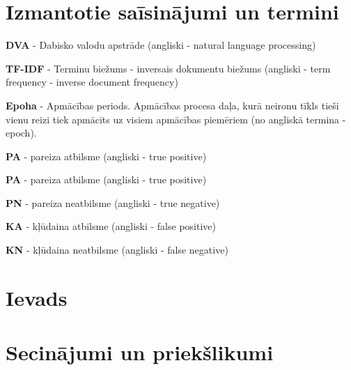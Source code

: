 \documentclass{VEA}
\begin{document}
\chapter*{Izmantotie saīsinājumi un termini}

\textbf{DVA} - Dabisko valodu apstrāde (angliski - natural language processing)

\textbf{TF-IDF} - Terminu biežums - inversais dokumentu biežums (angliski - term frequency - inverse document frequency)

\textbf{Epoha}  - Apmācības periods. Apmācības procesa daļa, kurā neironu tīkls tieši vienu reizi tiek apmācīts uz visiem apmācības piemēriem (no angliskā termina - epoch).

\textbf{PA} - pareiza atbilsme (angliski - true positive)

\textbf{PA} - pareiza atbilsme (angliski - true positive)

\textbf{PN} - pareiza neatbilsme (angliski - true negative)

\textbf{KA} - kļūdaina atbilsme (angliski - false positive)

\textbf{KN} - kļūdaina neatbilsme (angliski - false negative)

\chapter*{Ievads} %








\chapter*{Secinājumi un priekšlikumi}


\renewcommand{\bibname}{\uppercase{Izmantotās literatūras un avotu saraksts}}


\end{document}
